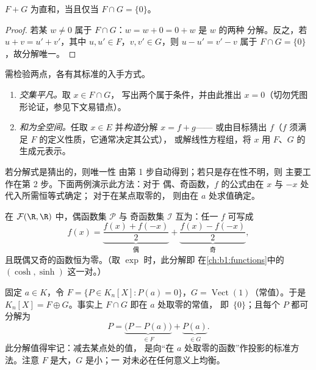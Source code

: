 \begin{proposition}\label{prop:b1:vspaces:directsum}
$F + G$ 为直和，当且仅当 $F \cap G = \{0\}$。
\end{proposition}

\begin{proof}
若某 $w \neq 0$ 属于 $F \cap G$：$w = w + 0 = 0 + w$ 是 $w$ 的两种
分解。反之，若 $u + v = u' + v'$，其中 $u, u'
\in F$，$v, v' \in G$，则 $u - u' = v' - v$ 属于 $F \cap G =
\{0\}$，故分解唯一。
\end{proof}

\begin{method}[证明 $E = F \oplus G$]
\label{met:b1:vspaces:directsum}
需检验两点，各有其标准的入手方式。
\begin{enumerate}
  \item \emph{交集平凡。}取 $x \in F \cap G$，
        写出两个属于条件，并由此推出 $x =
        0$（切勿凭图形论证，参见下文易错点）。
  \item \emph{和为全空间。}任取 $x \in E$
        并\emph{构造}分解 $x = f + g$——
        或由目标猜出 $f$（$f$ 须满足
        $F$ 的定义性质，它通常决定其公式），
        或解线性方程组，将 $x$
        用 $F$、$G$ 的生成元表示。
\end{enumerate}
若分解式是猜出的，则唯一性
由第 1 步自动得到；若只是存在性不明，则
主要工作在第 2 步。下面两例演示此方法：对于
偶、奇函数，$f$ 的公式由在 $x$ 与 $-x$ 处代入所需恒等式确定；
对于在某点取零的，
则由在 $a$ 处求值确定。
\end{method}

\begin{example}\label{ex:b1:vspaces:evenodd}
在 $\mathcal{F}(\R, \R)$ 中，偶函数集 $\mathcal{P}$ 与
奇函数集 $\mathcal{I}$ 互为：任一 $f$ 可写成
\[
f(x) = \underbrace{\frac{f(x) + f(-x)}{2}}_{\text{偶}}
+ \underbrace{\frac{f(x) - f(-x)}{2}}_{\text{奇}},
\]
且既偶又奇的函数恒为零。（取 $\exp$ 时，此分解即
在\cref{ch:b1:functions}中的 $(\cosh, \sinh)$ 这一对。）
\end{example}

\begin{example}[{$K_n[X]$ 中的一对补子空间}]
\label{ex:b1:vspaces:hyperplane}
固定 $a \in K$，令 $F = \{P \in K_n[X] : P(a) = 0\}$，$G =
\operatorname{Vect}(1)$（常值）。于是 $K_n[X] = F \oplus
G$。事实上 $F \cap G$ 即在 $a$ 处取零的常值，
即\ $\{0\}$；且每个 $P$ 都可分解为
\[
P = \underbrace{\bigl(P - P(a)\bigr)}_{\in F}
+ \underbrace{P(a)}_{\in G} .
\]
此分解值得牢记：减去某点处的值，
是向“在
$a$ 处取零的函数”作投影的标准方法。注意 $F$ 是大，$G$ 是小；一
对未必在任何意义上均衡。
\end{example}

